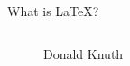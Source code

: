 \documentclass{beamer}
\begin{document}
\begin{frame}{What is \LaTeX?}
\begin{columns}
\begin{column}{0.4\textwidth}
\begin{figure}[h]
{                    \caption{Donald Knuth}
                }
            \end{figure}
        \end{column}
    \end{columns}


\end{frame}
\end{document}
